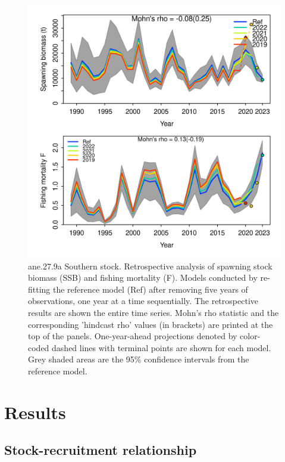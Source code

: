 \documentclass[
]{article}
\begin{document}
\begin{figure}[H]

{\centering \includegraphics[width=0.95\linewidth]{report/retro/S1.0_4FLEETS_SelECO_RecIndex_Mnewfix/Retro} 

}

\caption{ane.27.9a Southern stock. Retrospective analysis of spawning stock biomass (SSB) and fishing mortality (F). Models  conducted by re-fitting the reference model (Ref) after removing five years of observations, one year at a time sequentially. The retrospective results are shown the entire time series. Mohn's rho statistic and the corresponding 'hindcast rho' values (in brackets) are printed at the top of the panels. One-year-ahead projections denoted by color-coded dashed lines with terminal points are shown for each model. Grey shaded areas are the 95\% confidence intervals from the reference model.}\label{fig:unnamed-chunk-55}
\end{figure}

\hypertarget{results}{%
\section{Results}\label{results}}

\hypertarget{stock-recruitment-relationship}{%
\subsection{Stock-recruitment
relationship}\label{stock-recruitment-relationship}}
\end{document}

